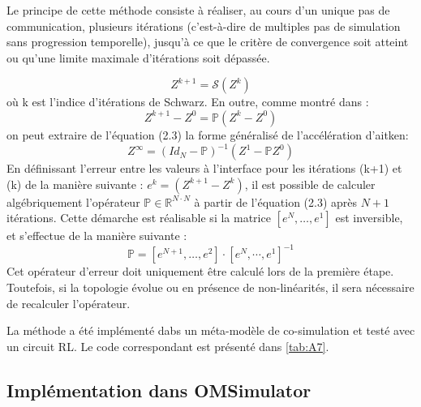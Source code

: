 Le principe de cette méthode consiste à réaliser, au cours d'un unique pas de communication, plusieurs itérations (c'est-à-dire de multiples pas de simulation sans progression temporelle), jusqu'à ce que le critère de convergence soit atteint ou qu'une limite maximale d'itérations soit dépassée.

\begin{equation}
    Z^{k+1}= \mathcal{S} (Z^{k})
\end{equation}
où k est l'indice d'itérations de Schwarz. En outre, comme montré dans \cite{b28}: 
\begin{equation}
    Z^{k+1}-Z^0 = \mathbb{P} (Z^k-Z^0)
\end{equation}
on peut extraire de l'équation (2.3) la forme généralisé de l’accélération d'aitken:
\begin{equation}
    Z^{\infty} = (Id_N - \mathbb{P} )^{-1} (Z^{1}-\mathbb{P} Z^0)
\end{equation}
En définissant l'erreur entre les valeurs à l'interface pour les itérations (k+1) et (k) de la manière suivante : $e^k = (Z^{k+1}-Z^k)$, il est possible de calculer algébriquement l'opérateur $\mathbb{P}\in\mathbb{R}^{N\cdot N}$ à partir de l'équation (2.3) après $N+1$ itérations. Cette démarche est réalisable si la matrice $[e^N,\dots, e^1]$ est inversible, et s'effectue de la manière suivante : 
\begin{equation}
    \mathbb{P} = [e^{N+1},\dots, e^2]\cdot[e^N,\cdots, e^1]^{-1}
\end{equation}
Cet opérateur d'erreur doit uniquement être calculé lors de la première étape. Toutefois, si la topologie évolue ou en présence de non-linéarités, il sera nécessaire de recalculer l'opérateur.\cite{b28}

La méthode a été implémenté dabs un méta-modèle de co-simulation et testé avec un circuit RL. Le code correspondant est présenté dans \ref{tab:A7}.
\subsection{Implémentation dans OMSimulator}

